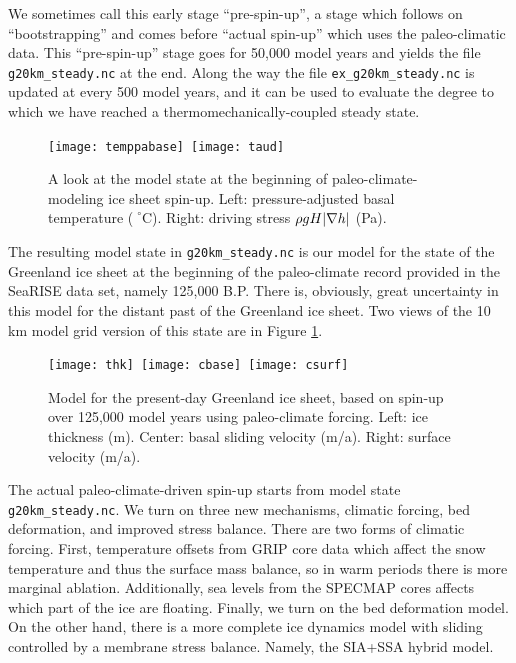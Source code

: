 We sometimes call this early stage ``pre-spin-up'', a stage which follows on ``bootstrapping'' and comes before ``actual spin-up'' which uses the paleo-climatic data.  This ``pre-spin-up'' stage goes for 50,000 model years and yields the file \texttt{g20km_steady.nc} at the end.  Along the way the file \texttt{ex_g20km_steady.nc} is updated at every 500 model years, and it can be used to evaluate the degree to which we have reached a thermomechanically-coupled steady state.


\begin{figure}[ht]
\centering
\mbox{\texttt{[image: temppabase]}
  \qquad \texttt{[image: taud]}}
\caption{A look at the model state at the beginning of paleo-climate-modeling ice sheet spin-up.  Left: pressure-adjusted basal temperature ($\phantom{|}^\circ$C).  Right: driving stress $\rho g H |\nabla h|$ (Pa).}
\label{fig:sr-spinstart}
\end{figure}

The resulting model state in \texttt{g20km_steady.nc} is our model for the state of the Greenland ice sheet at the beginning of the paleo-climate record provided in the SeaRISE data set, namely 125,000 B.P.  There is, obviously, great uncertainty in this model for the distant past of the Greenland ice sheet.  Two views of the 10\,km model grid version of this state are in Figure \ref{fig:sr-spinstart}.

\begin{figure}[ht]
\centering
\mbox{\texttt{[image: thk]}
  \qquad \texttt{[image: cbase]}
  \qquad \texttt{[image: csurf]}}
\caption{Model for the present-day Greenland ice sheet, based on spin-up over 125,000 model years using paleo-climate forcing.  Left: ice thickness (m).  Center: basal sliding velocity (m/a).  Right: surface velocity (m/a).}
\label{fig:sr-spindone-map}
\end{figure}


The actual paleo-climate-driven spin-up starts from model state \texttt{g20km_steady.nc}.  We turn on three new mechanisms, climatic forcing, bed deformation, and improved stress balance.  There are two forms of climatic forcing. First, temperature offsets from GRIP core data which affect the snow temperature and thus the surface mass balance, so in warm periods there is more marginal ablation.  Additionally, sea levels from the SPECMAP cores affects which part of the ice are floating. Finally, we turn on the bed deformation model. On the other hand, there is a more complete ice dynamics model with sliding controlled by a membrane stress balance.  Namely, the SIA+SSA hybrid model.

